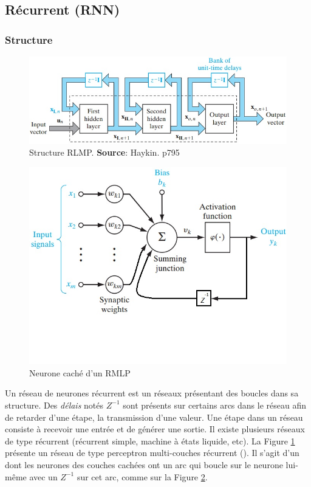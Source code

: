 \subsection{Récurrent (RNN)}
\subsubsection*{Structure}
\begin{figure}
 \centering
 \includegraphics[scale=0.5]{../figures/structurermlp.jpg}
 \caption{Structure RLMP. \textbf{Source}: Haykin. p795\cite{Haykin}}
 \label{structurermlp}
\end{figure}
\begin{figure}
 \centering
 \includegraphics[scale=0.5]{../figures/neuronermlp.jpg}
 \caption{Neurone caché d'un RMLP}
 \label{neuronermlp}
\end{figure}
Un réseau de neurones récurrent est un réseaux présentant des boucles dans sa structure.
Des \emph{délais} notés $Z^{-1}$ sont présents sur certains arcs dans le réseau afin de retarder d'une étape, la transmission d'une valeur.
Une étape dans un réseau consiste à recevoir une entrée et de générer une sortie.
Il existe plusieurs réseaux de type récurrent (récurrent simple, machine à états liquide, etc).
La Figure \ref{structurermlp} présente un réseau de type perceptron multi-couches récurrent (\rmlp).
Il s'agit d'un \mlp dont les neurones des couches cachées ont un arc qui boucle sur le neurone lui-même avec un $Z^{-1}$ sur cet arc, comme sur la Figure \ref{neuronermlp}.
